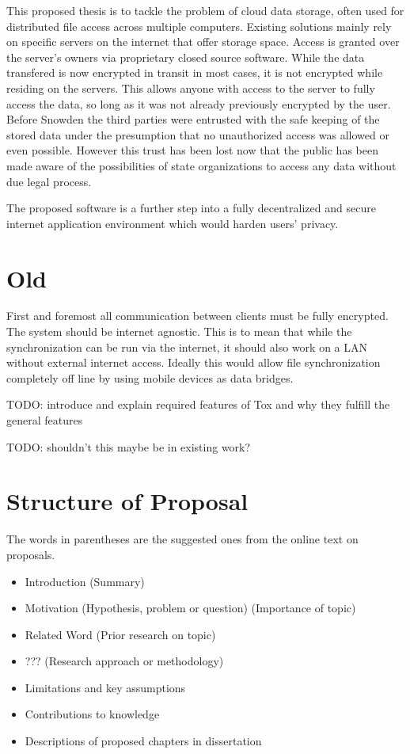 \documentclass[twoside]{article}
\begin{document}
This proposed thesis is to tackle the problem of cloud data storage, often used for distributed file access across multiple computers.
Existing solutions mainly rely on specific servers on the internet that offer storage space.
Access is granted over the server's owners via proprietary closed source software.
While the data transfered is now encrypted in transit in most cases, it is not encrypted while residing on the servers.
This allows anyone with access to the server to fully access the data, so long as it was not already previously encrypted by the user.
Before Snowden the third parties were entrusted with the safe keeping of the stored data under the presumption that no unauthorized access was allowed or even possible.
However this trust has been lost now that the public has been made aware of the possibilities of state organizations to access any data without due legal process.


The proposed software is a further step into a fully decentralized and secure internet application environment which would harden users' privacy.

\section{Old}

First and foremost all communication between clients must be fully encrypted.
The system should be internet agnostic.
This is to mean that while the synchronization can be run via the internet, it should also work on a LAN without external internet access.
Ideally this would allow file synchronization completely off line by using mobile devices as data bridges.

TODO: introduce and explain required features of Tox and why they fulfill the general features

TODO: shouldn’t this maybe be in existing work?

\section{Structure of Proposal}

The words in parentheses are the suggested ones from the online text on proposals.

\begin{itemize}
\item Introduction (Summary)
\item Motivation (Hypothesis, problem or question) (Importance of topic)
\item Related Word (Prior research on topic)
\item ??? (Research approach or methodology)
\item Limitations and key assumptions
\item Contributions to knowledge
\item Descriptions of proposed chapters in dissertation
\end{itemize}
\end{document}
